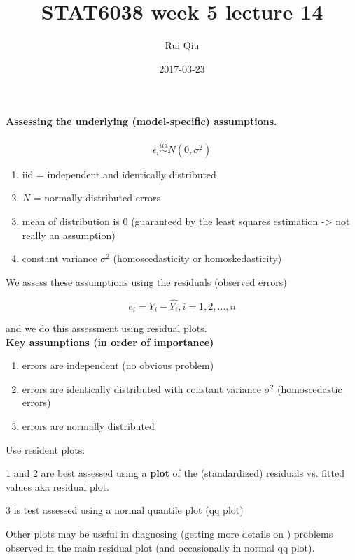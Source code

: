 \documentclass[a4paper, 11pt, twoside]{article}
\begin{document}
\title{STAT6038 week 5 lecture 14}
\author{Rui Qiu}
\date{2017-03-23}

\maketitle

\paragraph{Assessing the underlying (model-specific) assumptions.}

\[\epsilon_i \overset{iid}\sim N(0, \sigma^2)\]

\begin{enumerate}
	\item iid = independent and identically distributed
	\item $N$ = normally distributed errors
	\item mean of distribution is $0$ (guaranteed by the least squares estimation -> not really an assumption)
	\item constant variance $\sigma^2$ (homoscedasticity or homoskedasticity)
\end{enumerate}

We assess these assumptions using the residuals (observed errors)

\[e_i=Y_i-\hat{Y_i}, i = 1, 2, \dots , n\]

and we do this assessment using residual plots.\\

\textbf{Key assumptions (in order of importance)}

\begin{enumerate}
	\item errors are independent (no obvious problem)
	\item errors are identically distributed with constant variance $\sigma^2$ (homoscedastic errors)
	\item errors are normally distributed
\end{enumerate}

Use resident plots:

1 and 2 are best assessed using a \textbf{plot} of the (standardized) residuals vs. fitted values aka residual plot.

3 is test assessed using a normal quantile plot (qq plot)

Other plots may be useful in diagnosing (getting more details on ) problems observed in the main residual plot (and occasionally in normal qq plot).\\
\end{document}
